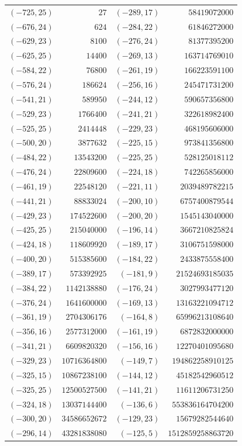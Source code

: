 {\scriptsize\begin{tabular}{@{}r@{\ \ }r@{\qquad}r@{\ \ }r@{}}
$(-725,25)$ & $27$ & $(-289,17)$ & $58419072000$ \\
$(-676,24)$ & $624$ & $(-284,22)$ & $61846272000$ \\
$(-629,23)$ & $8100$ & $(-276,24)$ & $81377395200$ \\
$(-625,25)$ & $14400$ & $(-269,13)$ & $163714769010$ \\
$(-584,22)$ & $76800$ & $(-261,19)$ & $166223591100$ \\
$(-576,24)$ & $186624$ & $(-256,16)$ & $245471731200$ \\
$(-541,21)$ & $589950$ & $(-244,12)$ & $590657356800$ \\
$(-529,23)$ & $1766400$ & $(-241,21)$ & $322618982400$ \\
$(-525,25)$ & $2414448$ & $(-229,23)$ & $468195606000$ \\
$(-500,20)$ & $3877632$ & $(-225,15)$ & $973841356800$ \\
$(-484,22)$ & $13543200$ & $(-225,25)$ & $528125018112$ \\
$(-476,24)$ & $22809600$ & $(-224,18)$ & $742265856000$ \\
$(-461,19)$ & $22548120$ & $(-221,11)$ & $2039489782215$ \\
$(-441,21)$ & $88833024$ & $(-200,10)$ & $6757400879544$ \\
$(-429,23)$ & $174522600$ & $(-200,20)$ & $1545143040000$ \\
$(-425,25)$ & $215040000$ & $(-196,14)$ & $3667210825824$ \\
$(-424,18)$ & $118609920$ & $(-189,17)$ & $3106751598000$ \\
$(-400,20)$ & $515385600$ & $(-184,22)$ & $2433875558400$ \\
$(-389,17)$ & $573392925$ & $(-181,9)$ & $21524693185035$ \\
$(-384,22)$ & $1142138880$ & $(-176,24)$ & $3027993477120$ \\
$(-376,24)$ & $1641600000$ & $(-169,13)$ & $13163221094712$ \\
$(-361,19)$ & $2704306176$ & $(-164,8)$ & $65996213108640$ \\
$(-356,16)$ & $2577312000$ & $(-161,19)$ & $6872832000000$ \\
$(-341,21)$ & $6609820320$ & $(-156,16)$ & $12270401095680$ \\
$(-329,23)$ & $10716364800$ & $(-149,7)$ & $194862258910125$ \\
$(-325,15)$ & $10867238100$ & $(-144,12)$ & $45182542960512$ \\
$(-325,25)$ & $12500527500$ & $(-141,21)$ & $11611206731250$ \\
$(-324,18)$ & $13037144400$ & $(-136,6)$ & $553836164704200$ \\
$(-300,20)$ & $34586652672$ & $(-129,23)$ & $15679282544640$ \\
$(-296,14)$ & $43281838080$ & $(-125,5)$ & $1512859258863720$ \\
\end{tabular}}\par
